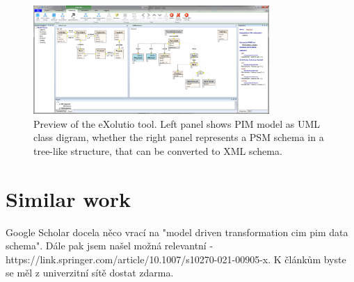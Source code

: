 \begin{figure}
    \centering
    \includegraphics[width=0.8\textwidth]{img/exolutio.png}
    \caption{Preview of the eXolutio tool. Left panel shows PIM model as UML class digram, whether the right panel represents a PSM schema in a tree-like structure, that can be converted to XML schema.}
\end{figure}

\section{Similar work}

Google Scholar docela něco vrací na "model driven transformation cim pim data schema". Dále pak jsem našel možná relevantní - https://link.springer.com/article/10.1007/s10270-021-00905-x. K článkům byste se měl z univerzitní sítě dostat zdarma.